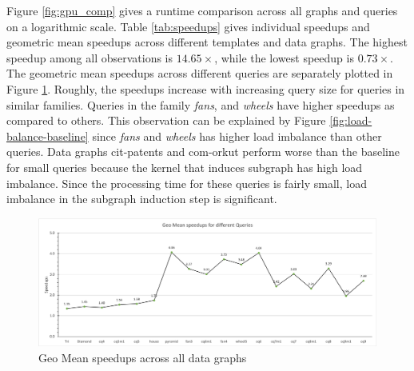 


Figure \ref{fig:gpu_comp} gives a runtime comparison across all graphs and queries on a logarithmic scale.
Table \ref{tab:speedups} gives individual speedups and geometric mean speedups across different templates and data graphs.
The highest speedup among all observations is $14.65\times$, while the lowest speedup is $0.73\times$.
The geometric mean speedups across different queries are separately plotted in Figure \ref{fig:query-speedups}.
Roughly, the speedups increase with increasing query size for queries in similar families.
Queries in the family \textit{fans}, and \textit{wheels} have higher speedups as compared to others.
This observation can be explained by Figure \ref{fig:load-balance-baseline} since \textit{fans} and \textit{wheels} has higher load imbalance than other queries.
Data graphs cit-patents and com-orkut perform worse than the baseline for small queries because the kernel that induces subgraph has high load imbalance.
Since the processing time for these queries is fairly small, load imbalance in the subgraph induction step is significant.

\begin{figure}
    \includegraphics[width=\textwidth]{fig/Results/query-speedups.png}
    \caption{Geo Mean speedups across all data graphs}
    \label{fig:query-speedups}
\end{figure}
